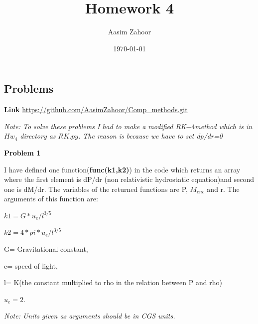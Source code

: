 \documentclass{article}
\title{Homework 4}
\author{Aasim Zahoor}
\date\today
\begin{document}
\maketitle 


\begin{center}
\section{Problems}
\end{center}
\textbf{Link}\vspace{1.5em}
\url{https://github.com/AasimZahoor/Comp_methods.git}
\vspace{1.5em}

\vspace{1.5em}


\emph{\scriptsize{Note: To solve these problems I had to make a modified RK$-4$method which is in $Hw_4$ directory as $RK.py$. The reason is because we have to set dp/dr=0}}

\vspace{0.5em}
\textbf{Problem 1}
\vspace{1.5em}

I have defined one function(\textbf{func(k1,k2)}) in the code which returns an array where the first element is dP/dr (non relativistic hydrostatic equation)and second one is dM/dr. The variables of the returned functions are P, $M_{enc}$ and r.
    The arguments of this function are:
      \vspace{0.2em}
      
    $k1=G*u_e/l^{3/5}$
    \vspace{0.2em}
    
    $k2=4*pi*u_e/l^{3/5}$
    \vspace{0.2em}
    
        G= Gravitational constant,
        \vspace{0.2em}
        
        c= speed of light,
        \vspace{0.2em}
        
        l= K(the constant multiplied to rho in the relation between P and rho)
        \vspace{0.2em}
        
        $u_{e}=2.$

          \vspace{0.2em}
        \emph{Note: Units given as arguments should be in CGS units.}
  
  \vspace{2.0em}
  
\end{document}
